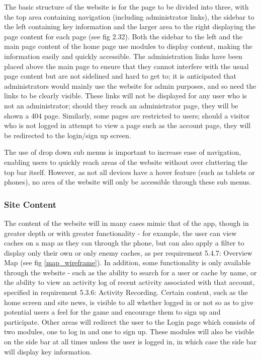 The basic structure of the website is for the page to be divided into three, with the top area containing navigation (including administrator links), the sidebar to the left containing key information and the larger area to the right displaying the page content for each page (see fig 2.32). Both the sidebar to the left and the main page content of the home page use modules to display content, making the information easily and quickly accessible. The administration links have been placed above the main page to ensure that they cannot interfere with the usual page content but are not sidelined and hard to get to; it is anticipated that administrators would mainly use the website for admin purposes, and so need the links to be clearly visible. These links will not be displayed for any user who is not an administrator; should they reach an administrator page, they will be shown a 404 page. Similarly, some pages are restricted to users; should a visitor who is not logged in attempt to view a page such as the account page, they will be redirected to the login/sign up screen.

The use of drop down sub menus is important to increase ease of navigation, enabling users to quickly reach areas of the website without over cluttering the top bar itself. However, as not all devices have a hover feature (such as tablets or phones), no area of the website will only be accessible through these sub menus.

\subsubsection{Site Content}

The content of the website will in many cases mimic that of the app, though in greater depth or with greater functionality - for example, the user can view caches on a map as they can through the phone, but can also apply a filter to display only their own or only enemy caches, as per requirement 5.4.7: Overview Map (see fig \ref{map_wireframe}). In addition, some functionality is only available through the website - such as the ability to search for a user or cache by name, or the ability to view an activity log of recent activity associated with that account, specified in requirement 5.3.6: Activity Recording. Certain content, such as the home screen and site news, is visible to all whether logged in or not so as to give potential users a feel for the game and encourage them to sign up and participate. Other areas will redirect the user to the Login page which consists of two modules, one to log in and one to sign up. These modules will also be visible on the side bar at all times unless the user is logged in, in which case the side bar will display key information.


